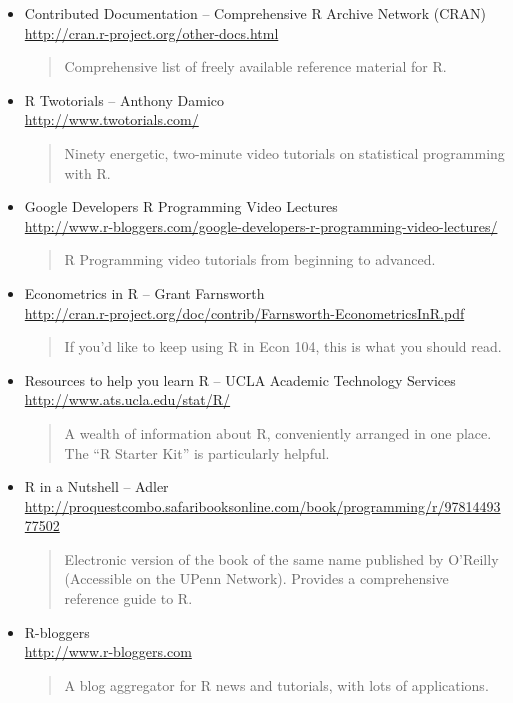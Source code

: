 \documentclass[11pt, letterpaper]{article}
\begin{document}
\begin{itemize}
		       \item Contributed Documentation -- Comprehensive R Archive Network (CRAN) \\\url{http://cran.r-project.org/other-docs.html}
           	\begin{quote}
           		Comprehensive list of freely available reference material for R.
           	\end{quote}
\item R Twotorials -- Anthony Damico \\\url{http://www.twotorials.com/}
		\begin{quote}
		Ninety energetic, two-minute video tutorials on statistical programming with R. 
		\end{quote}
			\item Google Developers R Programming Video Lectures\\ \url{http://www.r-bloggers.com/google-developers-r-programming-video-lectures/}\begin{quote}R Programming video tutorials from beginning to advanced. \end{quote}
		 	\item Econometrics in R -- Grant Farnsworth\\\url{http://cran.r-project.org/doc/contrib/Farnsworth-EconometricsInR.pdf}
 		\begin{quote}
 		If you'd like to keep using R in Econ 104, this is what you should read.
 		\end{quote}
 			\item Resources to help you learn R -- UCLA Academic Technology Services \\\url{http://www.ats.ucla.edu/stat/R/}
		\begin{quote}
			A wealth of information about R, conveniently arranged in one place. The ``R Starter Kit'' is particularly helpful.
		\end{quote}
	           \item R in a Nutshell -- Adler\\ \url{http://proquestcombo.safaribooksonline.com/book/programming/r/9781449377502}         
           	\begin{quote}
           		Electronic version of the book of the same name published by O'Reilly (Accessible on the UPenn Network). Provides a comprehensive reference guide to R.
           	\end{quote}
		\item R-bloggers \\\url{http://www.r-bloggers.com}
		\begin{quote}
			A blog aggregator for R news and tutorials, with lots of applications.
		\end{quote}
\end{itemize}
\end{document}
